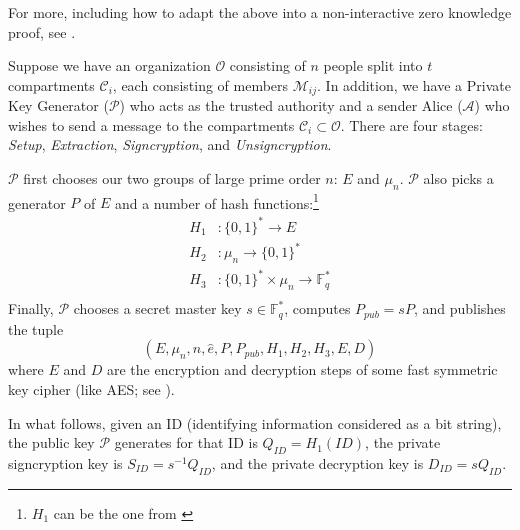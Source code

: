 For more, including how to adapt the above into a non-interactive zero
    knowledge proof, see \cite{baek2004identity}.



Suppose we have an organization $\mathcal{O}$ consisting of $n$ people split
    into $t$ compartments $\mathcal{C}_i$, each consisting of members
    $\mathcal{M}_{ij}$.
In addition, we have a Private Key Generator ($\mathcal{P}$) who acts as the
    trusted authority and a sender Alice ($\mathcal{A}$) who wishes to send a
    message to the compartments $\mathcal{C}_i \subset \mathcal{O}$.
There are four stages: \textit{Setup}, \textit{Extraction},
    \textit{Signcryption}, and \textit{Unsigncryption}.



$\mathcal{P}$ first chooses our two groups of large prime order $n$: $E$ and
    $\mu_n$.
$\mathcal{P}$ also picks a generator $P$ of $E$ and a number of  hash
    functions:\footnote{$H_1$ can be the one from \cite{icart2009hash}}
\begin{align*}
    H_1 &: \{0, 1\}^\ast \to E\\
    H_2 &: \mu_n \to \{0, 1\}^\ast\\
    H_3 &: \{0, 1\}^\ast \times \mu_n \to \mathbb{F}_q^\ast\\
\end{align*}
Finally, $\mathcal{P}$ chooses a secret master key $s \in \mathbb{F}_q^\ast$,
    computes $P_{pub} = sP$, and publishes the tuple
\[
(E, \mu_n, n, \widehat{e}, P, P_{pub}, H_1, H_2, H_3, E, D)
\]
    where $E$ and $D$ are the encryption and decryption steps of some fast
    symmetric key cipher (like AES; see \cite{daemen2002design}).



In what follows, given an ID (identifying information considered as a bit
    string), the public key $\mathcal{P}$ generates for that ID is $Q_{ID} =
    H_1(ID)$, the private signcryption key is $S_{ID} = s^{-1}Q_{ID}$, and the
    private decryption key is $D_{ID} = sQ_{ID}$.

